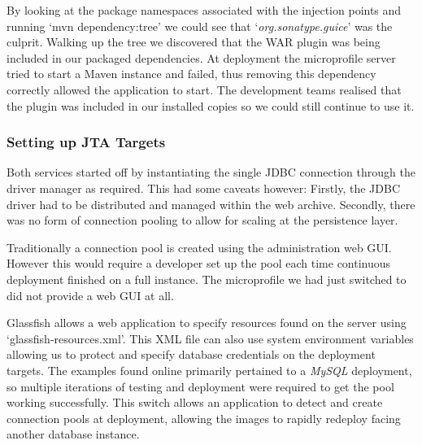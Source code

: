 \par
By looking at the package namespaces associated with the injection points and running `mvn dependency:tree' we could see that `\textit{org.sonatype.guice}' was the culprit. Walking up the tree we discovered that the WAR plugin was being included in our packaged dependencies. At deployment the microprofile server tried to start a Maven instance and failed, thus removing this dependency correctly allowed the application to start. The development teams realised that the plugin was included in our installed copies so we could still continue to use it.

\label{JTA_Targets}
\subsubsection{Setting up JTA Targets}
Both services started off by instantiating the single JDBC connection through the driver manager as required. This had some caveats however: Firstly, the JDBC driver had to be distributed and managed within the web archive. Secondly, there was no form of connection pooling to allow for scaling at the persistence layer.

\par
Traditionally a connection pool is created using the administration web GUI. However this would require a developer set up the pool each time continuous deployment finished on a full instance. The microprofile we had just switched to did not provide a web GUI at all.

\par
Glassfish allows a web application to specify resources found on the server using `glassfish-resources.xml'. This XML file can also use system environment variables allowing us to protect and specify database credentials on the deployment targets. The examples found online primarily pertained to a \textit{MySQL} deployment, so multiple iterations of testing and deployment were required to get the pool working successfully. This switch allows an application to detect and create connection pools at deployment, allowing the images to rapidly redeploy facing another database instance.
